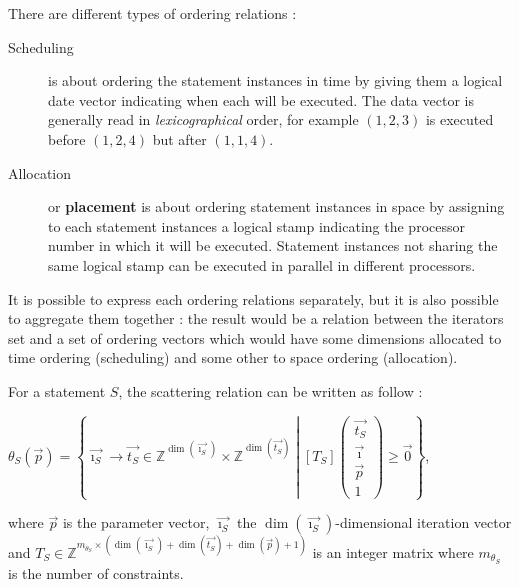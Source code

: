 \documentclass[paper=a4, fontsize=11.5pt]{scrartcl}
\numberwithin{equation}{section}        %
\numberwithin{figure}{section}          %
\numberwithin{table}{section}               %
\begin{document}
        There are different types of ordering relations :
        \begin{description}
            \item[Scheduling] is about ordering the statement instances in time by
                giving them a logical date vector indicating when each will be executed.
                The data vector is generally read in \textit{lexicographical} order, for example
                $(1,2,3)$ is executed before $(1,2,4)$ but after $(1,1,4)$.
            \item[Allocation] or \textbf{placement} is about ordering statement instances
                in space by assigning to each statement instances a logical stamp
                indicating the processor number in which it will be executed.
                Statement instances not sharing the same logical stamp can be
                executed in parallel in different processors.
        \end{description}

        It is possible to express each ordering relations separately,
        but it is also possible to aggregate them together : the result would be
        a relation between the iterators set and a set of ordering vectors which
        would have some dimensions allocated to time ordering (scheduling) and
        some other to space ordering (allocation).

        For a statement $S$, the scattering relation can be written as follow :
        \begin{center}
            $\theta_S(\vec{p}) = \left\{\vec{\imath_S} \to \vec{t_S} \in \mathbb{Z}^{\dim(\vec{\imath_S})}\times\mathbb{Z}^{\dim(\vec{t_S})}
            \middle|
            \left[T_S\right]\begin{pmatrix}\vec{t_S}\\ \vec{\imath} \\ \vec{p} \\ 1\end{pmatrix}
            \geq \vec{0}
            \right\}$,
        \end{center}
        where $\vec{p}$ is the parameter vector, $\vec{\imath_S}$ the $\dim(\vec{\imath_S})$-dimensional iteration vector
        and $T_S \in \mathbb{Z}^{m_{\theta_S}\times(\dim(\vec{\imath_S})+\dim(\vec{t_S})+\dim(\vec{p})+1)}$
        is an integer matrix where $m_{\theta_S}$ is the number of constraints.
\end{document}
